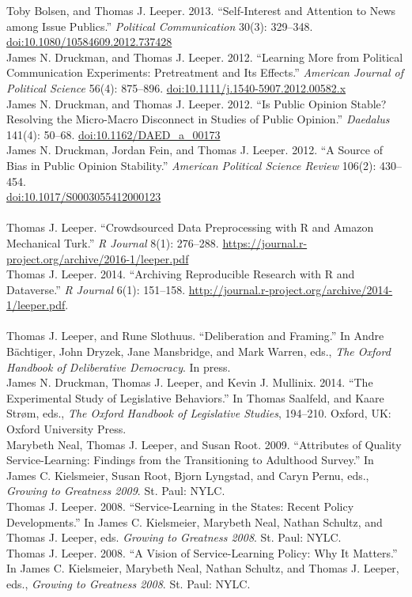 \documentclass[12pt]{article}
\newcommand{\topic}[1]{\pagebreak[3]\indent {\color{lg}{\footnotesize #1 }}\\}
\newcommand{\entry}[1]{\indent {\color{lg}\guillemotright}\hspace{2pt}#1\vspace{.25em}\\}
\begin{document}
	\entry{Toby Bolsen, and Thomas J. Leeper. 2013. ``Self-Interest and Attention to News among Issue Publics.'' \textit{Political Communication} 30(3): 329--348.\\ \href{http://doi.org/10.1080/10584609.2012.737428}{doi:10.1080/10584609.2012.737428}}
	\entry{James N. Druckman, and Thomas J. Leeper. 2012. ``Learning More from Political Communication Experiments: Pretreatment and Its Effects.'' \textit{American Journal of Political Science} 56(4): 875--896. \href{http://doi.org/10.1111/j.1540-5907.2012.00582.x}{doi:10.1111/j.1540-5907.2012.00582.x}}
	\entry{James N. Druckman, and Thomas J. Leeper. 2012. ``Is Public Opinion Stable? Resolving the Micro-Macro Disconnect in Studies of Public Opinion.'' \textit{Daedalus} 141(4): 50--68. \href{http://doi.org/10.1162/DAED\_a\_00173}{doi:10.1162/DAED\_a\_00173}}
	\entry{James N. Druckman, Jordan Fein, and Thomas J. Leeper. 2012. ``A Source of Bias in Public Opinion Stability.'' \textit{American Political Science Review} 106(2): 430--454.\\ \href{http://doi.org/10.1017/S0003055412000123}{doi:10.1017/S0003055412000123}}

\topic{Peer-Reviewed Publications: Software}
	\entry{Thomas J. Leeper. ``Crowdsourced Data Preprocessing with R and Amazon Mechanical Turk.'' \textit{R Journal} 8(1): 276--288. \href{https://journal.r-project.org/archive/2016-1/leeper.pdf}{https://journal.r-project.org/archive/2016-1/leeper.pdf}}
	\entry{Thomas J. Leeper. 2014. ``Archiving Reproducible Research with R and Dataverse.'' \textit{R Journal} 6(1): 151--158. \href{http://journal.r-project.org/archive/2014-1/leeper.pdf}{http://journal.r-project.org/archive/2014-1/leeper.pdf}.}

\topic{Chapters in Edited Volumes}
	\entry{Thomas J. Leeper, and Rune Slothuus. ``Deliberation and Framing.'' In Andre B{\"a}chtiger, John Dryzek, Jane Mansbridge, and Mark Warren, eds., \textit{The Oxford Handbook of Deliberative Democracy}. In press.}
	\entry{James N. Druckman, Thomas J. Leeper, and Kevin J. Mullinix. 2014. ``The Experimental Study of Legislative Behaviors.'' In Thomas Saalfeld, and Kaare Str\o m, eds., \textit{The Oxford Handbook of Legislative Studies}, 194--210. Oxford, UK: Oxford University Press.}
	\entry{Marybeth Neal, Thomas J. Leeper, and Susan Root. 2009. ``Attributes of Quality Service-Learning: Findings from the Transitioning to Adulthood Survey.'' In James C. Kielsmeier, Susan Root, Bjorn Lyngstad, and Caryn Pernu, eds., \textit{Growing to Greatness 2009}. St. Paul: NYLC.}
	\entry{Thomas J. Leeper. 2008. ``Service-Learning in the States: Recent Policy Developments.'' In James C. Kielsmeier, Marybeth Neal, Nathan Schultz, and Thomas J. Leeper, eds. \textit{Growing to Greatness 2008}. St. Paul: NYLC.}
	\entry{Thomas J. Leeper. 2008. ``A Vision of Service-Learning Policy: Why It Matters.'' In James C. Kielsmeier, Marybeth Neal, Nathan Schultz, and Thomas J. Leeper, eds., \textit{Growing to Greatness 2008}. St. Paul: NYLC.}
\end{document}
